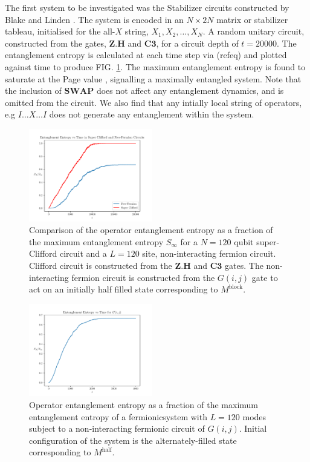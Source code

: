 
The first system to be investigated was the Stabilizer circuits constructed by Blake and Linden \cite{Blake2020}. The system is encoded in an $N \times 2N$ matrix or stabilizer tableau, initialised for the all-$X$ string, $X_1, X_2, \dots, X_N$. A random unitary circuit, constructed from the gates, $\mathbf{Z.H}$ and $\mathbf{C3}$, for a circuit depth of $t=20000$. The entanglement entropy is calculated at each time step via (refeq) and plotted against time to produce FIG. \ref{Bal}. The maximum entanglement entropy is found to saturate at the Page value \cite{Page_1993}, signalling a maximally entangled system. Note that the inclusion of $\mathbf{SWAP}$ does not affect any entanglement dynamics, and is omitted from the circuit. We also find that any intially local string of operators, e.g $I\dots X \dots I$ does not generate any entanglement within the system.

\begin{figure}[t!]
    \centering
    \includegraphics[width=0.48\textwidth]{reportimages/CliffvsFerm.pdf}
    \caption{Comparison of the operator entanglement entropy as a fraction of the maximum entanglement entropy $S_{\infty}$ for a $N = 120$ qubit super-Clifford circuit and a $L = 120$ site, non-interacting fermion circuit. Clifford circuit is constructed from the $\mathbf{Z.H}$ and $\mathbf{C3}$ gates. The non-interacting fermion circuit is constructed from the $G(i, j)$ gate to act on an initially half filled state corresponding to $M^{\text{block}}$. }
    \label{Bal}
\end{figure}
\begin{figure}[h!]
    \centering
    \includegraphics[width=0.48\textwidth]{reportimages/GFock120.pdf}
    \caption{Operator entanglement entropy as a fraction of the maximum entanglement entropy of a fermionicsystem with $L = 120$ modes subject to a non-interacting fermionic circuit of $G(i, j)$. Initial configuration of the system is the alternately-filled state corresponding to $M^{\text{half}}$.}
    \label{halffig}
\end{figure}



